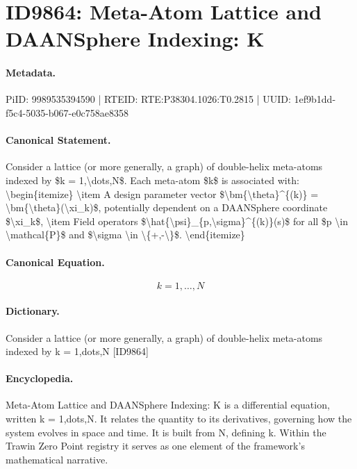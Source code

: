 \section*{ID9864: Meta-Atom Lattice and DAANSphere Indexing: K}
\paragraph{Metadata.}
PiID: 9989535394590 | RTEID: RTE:P38304.1026:T0.2815 | UUID: 1ef9b1dd-f5c4-5035-b067-e0c758ae8358

\paragraph{Canonical Statement.}
Consider a lattice (or more generally, a graph) of double-helix meta-atoms indexed by \$k = 1,\textbackslash{}dots,N\$. Each meta-atom \$k\$ is associated with: \textbackslash{}begin\{itemize\} \textbackslash{}item A design parameter vector \$\textbackslash{}bm\{\textbackslash{}theta\}\textasciicircum{}\{(k)\} = \textbackslash{}bm\{\textbackslash{}theta\}(\textbackslash{}xi\_k)\$, potentially dependent on a DAANSphere coordinate \$\textbackslash{}xi\_k\$, \textbackslash{}item Field operators \$\textbackslash{}hat\{\textbackslash{}psi\}\_\{p,\textbackslash{}sigma\}\textasciicircum{}\{(k)\}(s)\$ for all \$p \textbackslash{}in \textbackslash{}mathcal\{P\}\$ and \$\textbackslash{}sigma \textbackslash{}in \textbackslash{}\{+,-\textbackslash{}\}\$. \textbackslash{}end\{itemize\}

\paragraph{Canonical Equation.}
\[
k = 1,\dots,N
\]

\paragraph{Dictionary.}
Consider a lattice (or more generally, a graph) of double-helix meta-atoms indexed by k = 1,dots,N [ID9864]

\paragraph{Encyclopedia.}
Meta-Atom Lattice and DAANSphere Indexing: K is a differential equation, written k = 1,dots,N. It relates the quantity to its derivatives, governing how the system evolves in space and time. It is built from N, defining k. Within the Trawin Zero Point registry it serves as one element of the framework's mathematical narrative.
